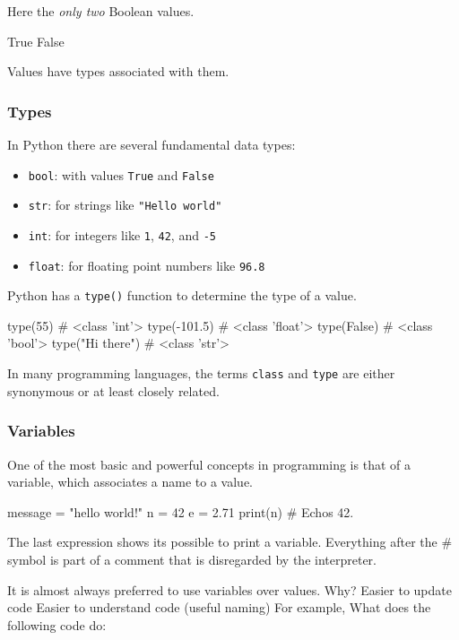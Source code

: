 \documentclass[12pt,letterpaper,twoside]{article}
\begin{document}
Here the \emph{only two} Boolean values.
\begin{python}
True
False
\end{python}

Values have types associated with them.

\subsubsection{Types}

In Python there are several fundamental data types:

\begin{itemize}
\item
  \texttt{bool}: with values \texttt{True} and \texttt{False}
\item
  \texttt{str}: for strings like \texttt{"Hello\ world"}
\item
  \texttt{int}: for integers like \texttt{1}, \texttt{42}, and
  \texttt{-5}
\item
  \texttt{float}: for floating point numbers like \texttt{96.8}
\end{itemize}

Python has a \texttt{type()} function to determine the type of a value.

\begin{python}
  type(55)               # <class 'int'>
  type(-101.5)           # <class 'float'>
  type(False)            # <class 'bool'>
  type("Hi there")       # <class 'str'>
\end{python}

In many programming languages, the terms \texttt{class} and \texttt{type}
are either synonymous or at least closely related.

\subsubsection{Variables}

One of the most basic and powerful concepts in programming is that of
  a variable, which associates a name to a value.

\begin{python}
message = "hello world!"
n = 42
e = 2.71
print(n)  # Echos 42.
\end{python}

The last expression shows its possible to print a variable. Everything
after the \# symbol is part of a comment that is disregarded by the interpreter.

It is almost always preferred to use variables over values. Why?
Easier to update code
Easier to understand code (useful naming)
For example, What does the following code do:
\end{document}

